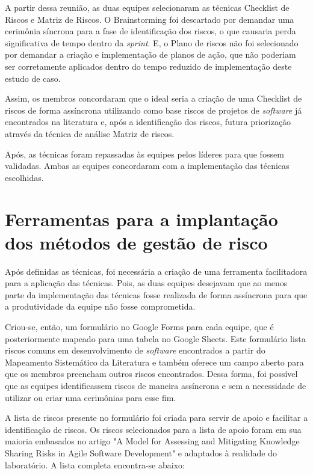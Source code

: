 \documentclass[
    12pt,       %
    openright,      %
    twoside,      %
    a4paper,      %
    english,      %
    french,       %
    spanish,      %
    brazil,       %
    ]{abntex2}
\begin{document}
A partir dessa reunião, as duas equipes selecionaram as técnicas Checklist de Riscos e Matriz de Riscos. O Brainstorming foi descartado por demandar uma cerimônia síncrona para a fase de identificação dos riscos, o que causaria perda significativa de tempo dentro da \textit{sprint}. E, o Plano de riscos não foi selecionado por demandar a criação e implementação de planos de ação, que não poderiam ser corretamente aplicados dentro do tempo reduzido de implementação deste estudo de caso. 

Assim, os membros concordaram que o ideal seria a criação de uma Checklist de riscos de forma assíncrona utilizando como base riscos de projetos de \textit{software} já encontrados na literatura e, após a identificação dos riscos, futura priorização através da técnica de análise Matriz de riscos.

Após, as técnicas foram repassadas às equipes pelos líderes para que fossem validadas. Ambas as equipes concordaram com a implementação das técnicas escolhidas.

\section{Ferramentas para a implantação dos métodos de gestão de risco}

Após definidas as técnicas, foi necessária a criação de uma ferramenta facilitadora para a aplicação das técnicas. Pois, as duas equipes desejavam que ao menos parte da implementação das técnicas fosse realizada de forma assíncrona para que a produtividade da equipe não fosse comprometida.

Criou-se, então, um formulário no Google Forms para cada equipe, que é posteriormente mapeado para uma tabela no Google Sheets. Este formulário lista riscos comuns em desenvolvimento de \textit{software} encontrados a partir do Mapeamento Sistemático da Literatura e também oferece um campo aberto para que os membros preencham outros riscos encontrados. Dessa forma, foi possível que as equipes identificassem riscos de maneira assíncrona e sem a necessidade de utilizar ou criar uma cerimônias para esse fim. 

A lista de riscos presente no formulário foi criada para servir de apoio e facilitar a identificação de riscos. Os riscos selecionados para a lista de apoio foram em sua maioria embasados no artigo "A Model for Assessing and Mitigating  Knowledge Sharing Risks in Agile Software Development" \cite{Ghobadi:2017} e adaptados à realidade do laboratório. A lista completa encontra-se abaixo:
\end{document}
